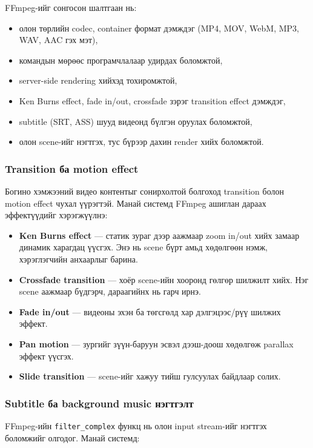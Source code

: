 FFmpeg-ийг сонгосон шалтгаан нь:

\begin{itemize}
\item олон төрлийн codec, container формат дэмждэг (MP4, MOV, WebM, MP3, WAV, AAC гэх мэт),
\item командын мөрөөс програмчлалаар удирдах боломжтой,
\item server-side rendering хийхэд тохиромжтой,
\item Ken Burns effect, fade in/out, crossfade зэрэг transition effect дэмждэг,
\item subtitle (SRT, ASS) шууд видеонд бүлгэн оруулах боломжтой,
\item олон scene-ийг нэгтгэх, тус бүрээр дахин render хийх боломжтой.
\end{itemize}

\subsubsection{Transition ба motion effect}

Богино хэмжээний видео контентыг сонирхолтой болгоход transition болон motion effect чухал үүрэгтэй. Манай системд FFmpeg ашиглан дараах эффектүүдийг хэрэгжүүлнэ:

\begin{itemize}
\item \textbf{Ken Burns effect} --- статик зураг дээр аажмаар zoom in/out хийх замаар динамик харагдац үүсгэх. Энэ нь scene бүрт амьд хөдөлгөөн нэмж, хэрэглэгчийн анхаарлыг барина.
\item \textbf{Crossfade transition} --- хоёр scene-ийн хооронд гөлгөр шилжилт хийх. Нэг scene аажмаар бүдгэрч, дараагийнх нь гарч ирнэ.
\item \textbf{Fade in/out} --- видеоны эхэн ба төгсгөлд хар дэлгэцээс/рүү шилжих эффект.
\item \textbf{Pan motion} --- зургийг зүүн-баруун эсвэл дээш-доош хөдөлгөж parallax эффект үүсгэх.
\item \textbf{Slide transition} --- scene-ийг хажуу тийш гулсуулах байдлаар солих.
\end{itemize}

\subsubsection{Subtitle ба background music нэгтгэлт}

FFmpeg-ийн \texttt{filter\_complex} функц нь олон input stream-ийг нэгтгэх боломжийг олгодог. Манай системд:

